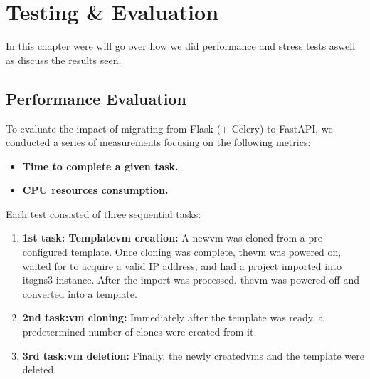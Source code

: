 
\chapter{Testing \& Evaluation}


\label{Chapter6TestingEvaluation}

In this chapter were will go over how we did performance and stress tests aswell as discuss the results seen.

\section{Performance Evaluation}

    To evaluate the impact of migrating from Flask (+ Celery) to FastAPI, we conducted a series of measurements 
    focusing on the following metrics:

    \begin{itemize}
        \item \textbf{Time to complete a given task.}
        \item \textbf{CPU resources consumption.}
    \end{itemize}

    Each test consisted of three sequential tasks:

    \begin{enumerate}
        \item \textbf{1st task: Template\ac{vm} creation:} A new\ac{vm} was cloned from a pre-configured template. Once 
        cloning was complete, the\ac{vm} was powered on, waited for to acquire a valid IP address, and had a 
        project imported into its\ac{gns3} instance. After the import was processed, the\ac{vm} was powered off 
        and converted into a template.

        \item \textbf{2nd task:\ac{vm} cloning:} Immediately after the template was ready, a predetermined number of clones 
        were created from it.

        \item \textbf{3rd task:\ac{vm} deletion:} Finally, the newly created\ac{vm}s and the template were deleted.
    \end{enumerate}

